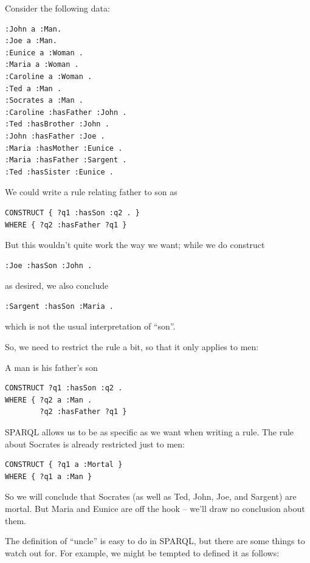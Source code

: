 Consider the following data:

\begin{lstlisting}
:John a :Man.
:Joe a :Man.
:Eunice a :Woman .
:Maria a :Woman .
:Caroline a :Woman .
:Ted a :Man .
:Socrates a :Man .
:Caroline :hasFather :John .
:Ted :hasBrother :John .
:John :hasFather :Joe .
:Maria :hasMother :Eunice .
:Maria :hasFather :Sargent .
:Ted :hasSister :Eunice .
\end{lstlisting}

We could write a rule relating father to son as

\begin{lstlisting}
CONSTRUCT { ?q1 :hasSon :q2 . }
WHERE { ?q2 :hasFather ?q1 }
\end{lstlisting}

But this wouldn't quite work the way we want; while we do construct


\begin{lstlisting}
:Joe :hasSon :John .
\end{lstlisting}

as desired, we also conclude

\begin{lstlisting}
:Sargent :hasSon :Maria .
\end{lstlisting}

which is not the usual interpretation of ``son''.

So, we need to restrict the rule a bit, so that it only applies to men:

\begin{query}A man is his father's son\end{query}
\begin{lstlisting}
CONSTRUCT ?q1 :hasSon :q2 .
WHERE { ?q2 a :Man .
        ?q2 :hasFather ?q1 }
\end{lstlisting} 


SPARQL allows us to be as specific as we want when writing a rule. The
rule about Socrates is already restricted just to men:

\begin{lstlisting}
CONSTRUCT { ?q1 a :Mortal }
WHERE { ?q1 a :Man }
\end{lstlisting}

So we will conclude that Socrates (as well as Ted, John, Joe, and
Sargent) are mortal. But Maria and 
Eunice are off the hook -- we'll draw no conclusion about them.

The definition of ``uncle'' is easy to do in SPARQL, but there are some 
things to watch out for.  For example, we might be tempted to defined it as follows: 

